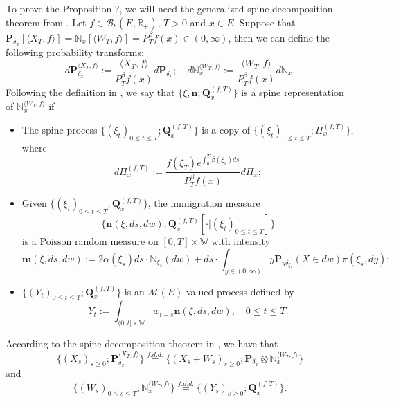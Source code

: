 \documentclass[UTF8]{pkuthss}
\theoremstyle{plain}
\theoremstyle{definition}
\numberwithin{equation}{section}
\begin{document}
    To prove the Proposition ?, we will need the generalized spine decomposition theorem from \cite{RenSongSun2017Spine}. 
    Let $f\in \mathcal B_b(E,\mathbb R_+)$, $T >0$ and $x\in E$.
    Suppose that $\mathbf P_{\delta_x}[\langle X_T, f\rangle] = \mathbb N_x[\langle W_T, f\rangle] = P^{\beta}_T f(x) \in (0,\infty)$, then we can define the following probability transforms:
\begin{equation}
    d\mathbf P_{\delta_x}^{\langle X_T, f\rangle}
    := \frac{\langle X_T, f\rangle}{P_T^{\beta} f(x)} d\mathbf P_{\delta_x};
    \quad d\mathbb N_x^{\langle W_T, f\rangle}
    :=  \frac{\langle W_T, f\rangle}{P_T^{\beta} f(x)} d\mathbb N_x.
\end{equation}
    Following the definition in \cite{RenSongSun2017Spine}, we say that $\{\xi, \mathbf n;\mathbf Q_{x}^{(f,T)}\}$ is a spine representation of $\mathbb N_x^{\langle W_T, f\rangle}$ if
\begin{itemize}
\item
    The spine process $\{(\xi_t)_{0\leq t\leq T}; \mathbf Q^{(f,T)}_x\}$ is a copy of $\{(\xi_t)_{0\leq t\leq T}; \Pi^{(f,T)}_{x}\}$,
    where
\begin{equation}
    d\Pi_x^{(f,T)} := \frac{f(\xi_T)e^{\int_0^T \beta(\xi_s)ds}}{P^{\beta}_T f(x)} d \Pi_x;
\end{equation}
\item
    Given $\{(\xi_t)_{0\leq t\leq T}; \mathbf Q^{(f,T)}_x\}$, the immigration measure 
\[ \{\mathbf n(\xi,ds,dw); \mathbf Q^{(f,T)}_x[\cdot |(\xi_t)_{0\leq t\leq T}]\}\]
    is a Poisson random measure on $[0,T] \times \mathbb W$ with intensity
\begin{equation}
\label{eq: conditional intensity}
    \mathbf m(\xi,ds,dw)
    := 2 \alpha(\xi_s) ds \cdot \mathbb N_{\xi_s}(dw) + ds \cdot \int_{y\in (0,\infty)} y \mathbf P_{y\delta_{\xi_s}}(X\in dw) \pi(\xi_s,dy);
\end{equation}
\item
    $\{(Y_t)_{0\leq t\leq T}; \mathbf Q^{(f,T)}_x\}$ is an $\mathcal M(E)$-valued process defined by
\begin{equation}
    Y_t
    := \int_{(0,t] \times \mathbb W} w_{t-s} \mathbf n(\xi,ds,dw),
    \quad 0 \leq t\leq T.
\end{equation}
\end{itemize}
    According to the spine decomposition theorem in \cite{RenSongSun2017Spine}, we have that
\begin{equation}
\label{eq: Spine decomposition 1}
    \{(X_s)_{s \geq 0};\mathbf P_{\delta_x}^{\langle X_T, f\rangle}\}
    \overset{f.d.d.}{=} \{(X_s + W_s)_{s \geq 0};\mathbf P_{\delta_x} \otimes \mathbb N_x^{\langle W_T, f\rangle} \}
\end{equation}
    and
\begin{equation}
\label{eq: Spine decomposition 2}
    \{(W_s)_{0\leq s\leq T};\mathbb N_x^{\langle W_T, f\rangle}\}
    \overset{f.d.d.}{=} \{(Y_s)_{s \geq 0};\mathbf Q_x^{(f,T)}\}.
\end{equation}
\end{document}

